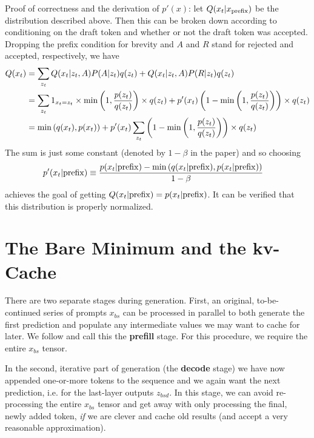Proof of correctness and the derivation of $ p'(x) $: let $ Q(x_t| x _{ {\rm  prefix}  }) $ be
the distribution described above. Then this can be broken down according to conditioning on the
draft token and whether or not the draft token was accepted. Dropping the prefix condition for
brevity and $ A $ and $ R $ stand for rejected and accepted, respectively, we have
\begin{align}
    Q(x_t) &=\sum _{ z _{ t } } Q(x_t|z _{ t } , A)P(A|z _{ t }) q(z _{ t }) + Q(x_t|z _{ t } , A)P(R|z _{ t }) q(z _{ t }) \nonumber\\
         &=\sum _{ z _{ t } } 1 _{ x _{ t }= z _{  t } } \times\min \left (1, \frac{ p(z _{ t }) }{ q( z _{ t })
         }\right ) \times q (z _{  t })  + p'(x _{ t })\left (1 - \min \left (1, \frac{ p(z _{ t }) }{ q( z _{ t })
         }\right )  \right) \times q(z _{ t }) \nonumber\\
         &= \min \left (q(x _{ t }),  p(x _{ t })\right ) + p'(x _{ t })\sum _{ z _{ t } }\left (1 - \min \left (1, \frac{ p(z _{ t }) }{ q( z _{ t })
         }\right )  \right) \times q(z _{ t })
\end{align}
The sum is just some constant (denoted by $ 1 - \beta  $ in the paper) and so choosing
\begin{align}
    p'(x _{ t }| {\rm prefix}) &\equiv \frac{ p(x _{ t }| {\rm  prefix}) - \min \left ( q(x _{ t }| {\rm  prefix}), p(x _{ t }| {\rm  prefix}) \right ) }{ 1- \beta }
\end{align}
achieves the goal of getting $Q(x _{ t }| {\rm  prefix}) = p(x _{ t }| {\rm prefix}) $. It can be
verified that this distribution is properly normalized.


\section{The Bare Minimum and the kv-Cache \label{sec_kv_cache}}


There are two separate stages during generation. First, an original, to-be-continued series of prompts
$ x _{ bs }  $ can be processed in parallel to both generate the first prediction and populate any
intermediate values we may want to cache for later. We follow \cite{pope2022efficiently} and call this the
\textbf{prefill} stage. For this procedure, we require the entire $ x _{ bs } $ tensor.

In the second, iterative part of generation (the \textbf{decode} stage) we have now appended
one-or-more tokens to the sequence and we again want the next prediction, i.e. 
for the last-layer outputs $ z _{ bsd } $. In this stage, we can avoid re-processing the entire $ x
		_{ bs } $ tensor and get away with only processing the final, newly added token, \textit{if} we are
clever and cache old results (and accept a very reasonable approximation).

